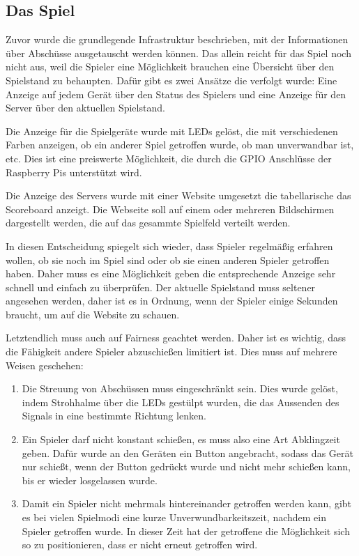 \subsection{Das Spiel}
Zuvor wurde die grundlegende Infrastruktur beschrieben, mit der Informationen über Abschüsse
ausgetauscht werden können.
Das allein reicht für das Spiel noch nicht aus, weil die Spieler eine Möglichkeit brauchen eine
Übersicht über den Spielstand zu behaupten.
Dafür gibt es zwei Ansätze die verfolgt wurde: Eine Anzeige auf jedem Gerät über den Status des
Spielers und eine Anzeige für den Server über den aktuellen Spielstand.

Die Anzeige für die Spielgeräte wurde mit LEDs gelöst, die mit verschiedenen Farben anzeigen, ob ein
anderer Spiel getroffen wurde, ob man unverwandbar ist, etc. Dies ist eine preiswerte Möglichkeit,
die durch die GPIO Anschlüsse der Raspberry Pis unterstützt wird.

Die Anzeige des Servers wurde mit einer Website umgesetzt die tabellarische das Scoreboard anzeigt.
Die Webseite soll auf einem oder mehreren Bildschirmen dargestellt werden, die auf das gesammte
Spielfeld verteilt werden.

In diesen Entscheidung spiegelt sich wieder, dass Spieler regelmäßig erfahren wollen, ob sie noch im
Spiel sind oder ob sie einen anderen Spieler getroffen haben. Daher muss es eine Möglichkeit geben
die entsprechende Anzeige sehr schnell und einfach zu überprüfen. Der aktuelle Spielstand muss
seltener angesehen werden, daher ist es in Ordnung, wenn der Spieler einige Sekunden braucht, um auf
die Website zu schauen.

Letztendlich muss auch auf Fairness geachtet werden.
Daher ist es wichtig, dass die Fähigkeit andere Spieler abzuschießen limitiert ist.
Dies muss auf mehrere Weisen geschehen:
\begin{enumerate}
  \item
    Die Streuung von Abschüssen muss eingeschränkt sein.
    Dies wurde gelöst, indem Strohhalme über die LEDs gestülpt wurden, die das Aussenden des Signals
    in eine bestimmte Richtung lenken.
  \item
    Ein Spieler darf nicht konstant schießen, es muss also eine Art Abklingzeit geben.
    Dafür wurde an den Geräten ein Button angebracht, sodass das Gerät nur schießt, wenn der Button
    gedrückt wurde und nicht mehr schießen kann, bis er wieder losgelassen wurde.
  \item
    Damit ein Spieler nicht mehrmals hintereinander getroffen werden kann, gibt es bei vielen
    Spielmodi eine kurze Unverwundbarkeitszeit, nachdem ein Spieler getroffen wurde.
    In dieser Zeit hat der getroffene die Möglichkeit sich so zu positionieren, dass er nicht erneut
    getroffen wird.
\end{enumerate}
